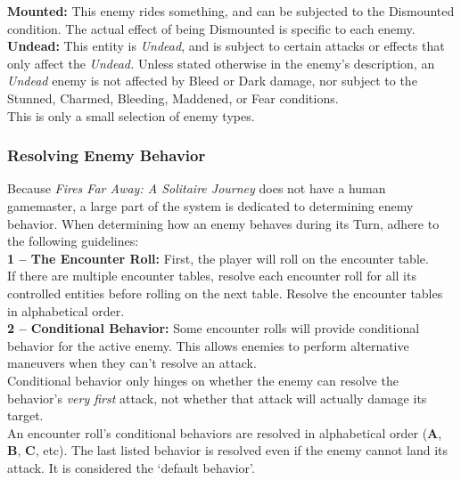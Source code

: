 \documentclass[12pt]{article}
\begin{document}
\begin{multicols*}{2}
\textbf{Mounted:} This enemy rides something, and can be subjected to the Dismounted condition. The actual effect of being Dismounted is specific to each enemy.\\

\textbf{Undead:} This entity is \emph{Undead}, and is subject to certain attacks or effects that only affect the \emph{Undead.} Unless stated otherwise in the enemy’s description, an \emph{Undead} enemy is not affected by Bleed or Dark damage, nor subject to the Stunned, Charmed, Bleeding, Maddened, or Fear conditions.\\

This is only a small selection of enemy types.

\subsubsection{Resolving Enemy Behavior}
Because \emph{Fires Far Away: A Solitaire Journey} does not have a human gamemaster, a large part of the system is dedicated to determining enemy behavior. When determining how an enemy behaves during its Turn, adhere to the following guidelines:\\

\textbf{1 -- The Encounter Roll:} First, the player will roll on the encounter table.\\
If there are multiple encounter tables, resolve each encounter roll for all its controlled entities before rolling on the next table. Resolve the encounter tables in alphabetical order.\\

\textbf{2 -- Conditional Behavior:} Some encounter rolls will provide conditional behavior for the active enemy. This allows enemies to perform alternative maneuvers when they can’t resolve an attack.\\
Conditional behavior only hinges on whether the enemy can resolve the behavior’s \emph{very first} attack, not whether that attack will actually damage its target.\\
An encounter roll’s conditional behaviors are resolved in alphabetical order (\textbf{A}, \textbf{B}, \textbf{C}, etc). The last listed behavior is resolved even if the enemy cannot land its attack. It is considered the ‘default behavior’.\\


\end{multicols*}
\end{document}
